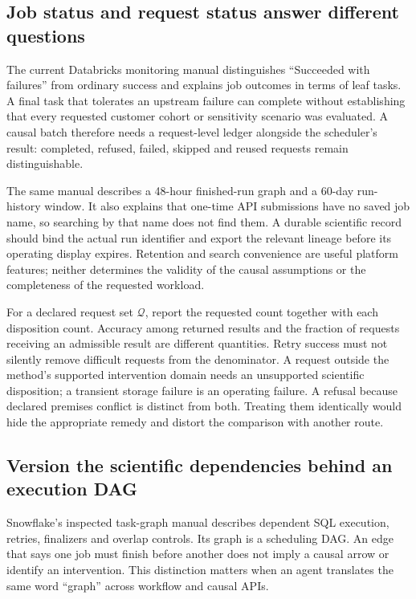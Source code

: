\subsection{Job status and request status answer different questions}

The current Databricks monitoring manual distinguishes ``Succeeded with
failures'' from ordinary success and explains job outcomes in terms of leaf
tasks. A final task that tolerates an upstream failure can complete without
establishing that every requested customer cohort or sensitivity scenario was
evaluated. A causal batch therefore needs a request-level ledger alongside the
scheduler's result: completed, refused, failed, skipped and reused requests
remain distinguishable.~\citep{exec22_workflow_databricks_monitor}

The same manual describes a 48-hour finished-run graph and a 60-day run-history
window. It also explains that one-time API submissions have no saved job name,
so searching by that name does not find them. A durable scientific record
should bind the actual run identifier and export the relevant lineage before
its operating display expires. Retention and search convenience are useful
platform features; neither determines the validity of the causal assumptions
or the completeness of the requested workload.
\citep{exec22_workflow_databricks_monitor}

For a declared request set $\mathcal Q$, report the requested count together
with each disposition count. Accuracy among returned results and the fraction
of requests receiving an admissible result are different quantities. Retry
success must not silently remove difficult requests from the denominator.
A request outside the method's supported intervention domain needs an
unsupported scientific disposition; a transient storage failure is an operating
failure. A refusal because declared premises conflict is distinct from both. Treating them identically would hide the
appropriate remedy and distort the comparison with another route.

\subsection{Version the scientific dependencies behind an execution DAG}

Snowflake's inspected task-graph manual describes dependent SQL execution,
retries, finalizers and overlap controls. Its graph is a scheduling DAG. An
edge that says one job must finish before another does not imply a causal
arrow or identify an intervention. This distinction matters when an agent
translates the same word ``graph'' across workflow and causal APIs.
\citep{exec22_workflow_snowflake_graphs}

